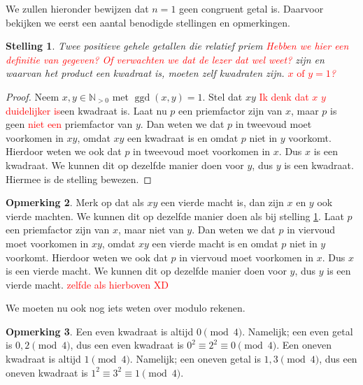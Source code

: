 \documentclass[12pt,reqno]{article}
\newcommand*{\NO}{\ensuremath{\mathbb{N}_{>0}}}
\theoremstyle{theorem}
\newtheorem{theorem}{Stelling}
\theoremstyle{definition}
\newtheorem{remark}[theorem]{Opmerking}
\DeclareMathOperator{\ggd}{ggd}
\begin{document}
	We zullen hieronder bewijzen dat $n=1$ geen congruent getal is. Daarvoor bekijken we eerst een aantal benodigde stellingen en opmerkingen.
	\begin{theorem}\label{1:hulp2}
		Twee positieve gehele getallen die relatief priem \textcolor{red}{Hebben we hier een definitie van gegeven? Of verwachten we dat de lezer dat wel weet?} zijn en waarvan het product een kwadraat is, moeten zelf kwadraten zijn. \textcolor{red}{$x \text{ of } y = 1$?}
	\end{theorem}
	\begin{proof}
		Neem $x,y\in\NO$ met $\ggd(x,y) = 1$. Stel dat $xy$ \textcolor{red}{Ik denk dat $x$ \cdot $y$ duidelijker is}een kwadraat is. Laat nu $p$ een priemfactor zijn van $x$, maar $p$ is geen \textcolor{red}{niet een} priemfactor van $y$. Dan weten we dat $p$ in tweevoud moet voorkomen in $xy$, omdat $xy$ een kwadraat is en omdat $p$ niet in $y$ voorkomt. Hierdoor weten we ook dat $p$ in tweevoud moet voorkomen in $x$. Dus $x$ is een kwadraat. We kunnen dit op dezelfde manier doen voor $y$, dus $y$ is een kwadraat. Hiermee is de stelling bewezen.
	\end{proof}
	
	\begin{remark}\label{1:hulp4}
		Merk op dat als $xy$ een vierde macht is, dan zijn $x$ en $y$ ook vierde machten. We kunnen dit op dezelfde manier doen als bij stelling \ref{1:hulp2}. Laat $p$ een priemfactor zijn van $x$, maar niet van $y$. Dan weten we dat $p$ in viervoud moet voorkomen in $xy$, omdat $xy$ een vierde macht is en omdat $p$ niet in $y$ voorkomt. Hierdoor weten we ook dat $p$ in viervoud moet voorkomen in $x$. Dus $x$ is een vierde macht. We kunnen dit op dezelfde manier doen voor $y$, dus $y$ is een vierde macht. \textcolor{red}{zelfde als hierboven XD}
	\end{remark}
	
	We moeten nu ook nog iets weten over modulo rekenen.
	\begin{remark}\label{1:hulpMod}
		Een even kwadraat is altijd $0 \pmod{4}$. Namelijk; een even getal is $0,2 \pmod{4}$, dus een even kwadraat is $0^2 \equiv 2^2 \equiv 0 \pmod{4}$. Een oneven kwadraat is altijd $1 \pmod{4}$. Namelijk; een oneven getal is $1,3 \pmod{4}$, dus een oneven kwadraat is $1^2 \equiv 3^2 \equiv 1 \pmod{4}$.
	\end{remark}
		
\end{document}
